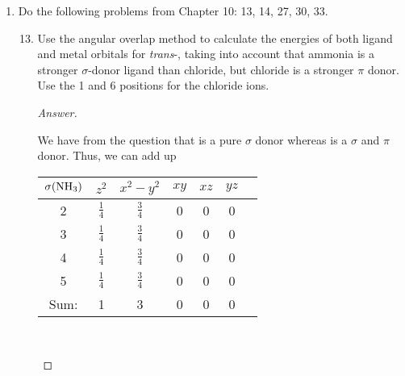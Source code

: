 \documentclass[../psets.tex]{subfiles}
\begin{document}
\begin{enumerate}[label={\Roman*)}]
    \item {}Do the following problems from Chapter 10: 13, 14, 27, 30, 33.
    \begin{enumerate}[label={\textbf{10.\arabic*}}]
        \setcounter{enumii}{12}
        \item Use the angular overlap method to calculate the energies of both ligand and metal orbitals for \emph{trans}-\ce{[Cr(NH3)4Cl2]+}, taking into account that ammonia is a stronger $\sigma$-donor ligand than chloride, but chloride is a stronger $\pi$ donor. Use the 1 and 6 positions for the chloride ions.
        \begin{proof}[Answer]
            ${\color{white}hi}$
            \begin{center}
                \chemleft{[}
                \chemright{]^{+}}
            \end{center}
            We have from the question that  is a pure $\sigma$ donor whereas  is a $\sigma$ and $\pi$ donor. Thus, we can add up
            \begin{center}
                \small
                \renewcommand{\arraystretch}{1.4}
                \begin{tabular}{c|cccccc}
                    $\sigma(\ce{NH3})$ & $z^2$ & $x^2-y^2$ & $xy$ & $xz$ & $yz$\\
                    \hline
                    2 & $\frac{1}{4}$ & $\frac{3}{4}$ & 0 & 0 & 0\\
                    3 & $\frac{1}{4}$ & $\frac{3}{4}$ & 0 & 0 & 0\\
                    4 & $\frac{1}{4}$ & $\frac{3}{4}$ & 0 & 0 & 0\\
                    5 & $\frac{1}{4}$ & $\frac{3}{4}$ & 0 & 0 & 0\\
                    \hline
                    Sum: & 1 & 3 & 0 & 0 & 0\\
                \end{tabular}\\[1em]

\end{center}
\end{proof}
\end{enumerate}
\end{enumerate}
\end{document}
